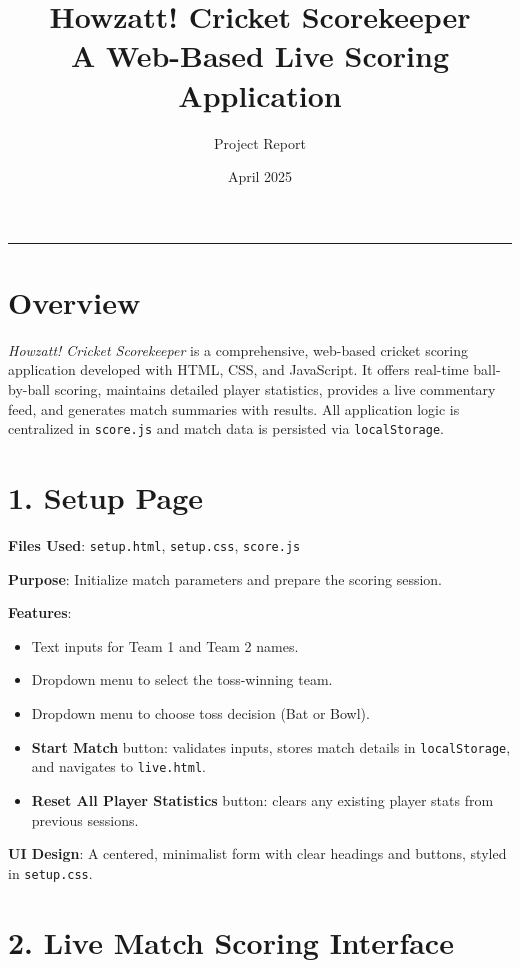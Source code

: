 \documentclass[a4paper,12pt]{article}
\title{Howzatt! Cricket Scorekeeper \\ \large A Web-Based Live Scoring Application}
\author{Project Report}
\date{April 2025}
\begin{document}
\maketitle
\hrule
\vspace{1cm}

\section*{Overview}

\textit{Howzatt! Cricket Scorekeeper} is a comprehensive, web-based cricket scoring application developed with HTML, CSS, and JavaScript. It offers real-time ball-by-ball scoring, maintains detailed player statistics, provides a live commentary feed, and generates match summaries with results. All application logic is centralized in \texttt{score.js} and match data is persisted via \texttt{localStorage}.

\vspace{0.5cm}

\section*{1. Setup Page}

\textbf{Files Used}: \texttt{setup.html}, \texttt{setup.css}, \texttt{score.js}

\textbf{Purpose}: Initialize match parameters and prepare the scoring session.

\textbf{Features}:
\begin{itemize}
  \item Text inputs for Team 1 and Team 2 names.
  \item Dropdown menu to select the toss-winning team.
  \item Dropdown menu to choose toss decision (Bat or Bowl).
  \item \textbf{Start Match} button: validates inputs, stores match details in \texttt{localStorage}, and navigates to \texttt{live.html}.
  \item \textbf{Reset All Player Statistics} button: clears any existing player stats from previous sessions.
\end{itemize}

\textbf{UI Design}: A centered, minimalist form with clear headings and buttons, styled in \texttt{setup.css}.

\vspace{0.5cm}

\section*{2. Live Match Scoring Interface}
\end{document}
